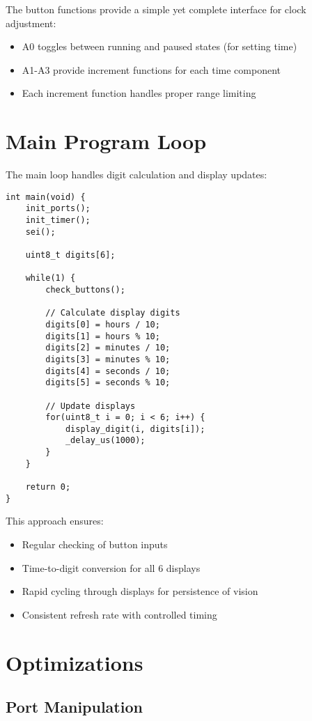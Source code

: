 \documentclass[12pt,a4paper]{article}
\begin{document}
The button functions provide a simple yet complete interface for clock adjustment:
\begin{itemize}
    \item A0 toggles between running and paused states (for setting time)
    \item A1-A3 provide increment functions for each time component
    \item Each increment function handles proper range limiting
\end{itemize}

\section{Main Program Loop}

The main loop handles digit calculation and display updates:

\begin{lstlisting}
int main(void) {
    init_ports();
    init_timer();
    sei();

    uint8_t digits[6];
    
    while(1) {
        check_buttons();

        // Calculate display digits
        digits[0] = hours / 10;
        digits[1] = hours % 10;
        digits[2] = minutes / 10;
        digits[3] = minutes % 10;
        digits[4] = seconds / 10;
        digits[5] = seconds % 10;

        // Update displays
        for(uint8_t i = 0; i < 6; i++) {
            display_digit(i, digits[i]);
            _delay_us(1000);
        }
    }
    
    return 0;
}
\end{lstlisting}

This approach ensures:
\begin{itemize}
    \item Regular checking of button inputs
    \item Time-to-digit conversion for all 6 displays
    \item Rapid cycling through displays for persistence of vision
    \item Consistent refresh rate with controlled timing
\end{itemize}

\section{Optimizations}

\subsection{Port Manipulation}
\end{document}
